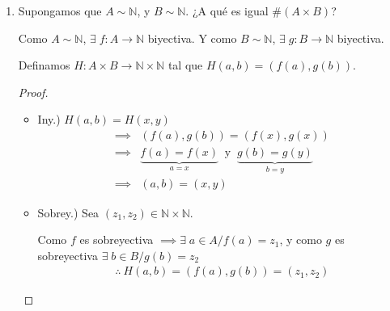 \begin{enumerate}
\begin{proof}\phantom{.}
    \begin{itemize}
        \item Iny.) $F(n) = F(k) \implies 2n+1 = 2k+1 \implies n = k$
        \item Sobrey.) Sea $b \in X$, siendo $b$ impar y $b \geq 1$ y $b-1$ par
            para $b\geq 0$.

            Así, $\frac{b-1}{2} \in \mathbb{N}$, con lo cual 
            $F\left(\frac{b-1}{2}\right) = 2\; . \; \left(\frac{b-1}{2}\right)
            + 1 = b$
        \item Biy.) Como es inyectiva y sobreyectiva, entonces es biyectiva.
    \end{itemize}
    \begin{gather*}
        \therefore ~ \#X=\#\mathbb{N} = \aleph_0
    \end{gather*}

\end{proof}


\item Supongamos que $A \sim \mathbb{N}$, y $B \sim \mathbb{N}$.
        ¿A qué es igual $\# (A\times B)$?

Como $A \sim \mathbb{N}$, $\exists \; f: A\to\mathbb{N}$ biyectiva.
Y como $B\sim\mathbb{N}$, $\exists \; g: B\to\mathbb{N}$ biyectiva.

Definamos $H: A \times B \to \mathbb{N}\times\mathbb{N}$ tal que 
$H(a,b) = \left(f(a), g(b)\right)$.

\begin{proof}\phantom{.}

    \begin{itemize}
        \item Iny.) $H(a,b) = H(x,y)$ 
            \begin{align*}
                \implies& \left(f(a),g(b)\right) = \left(f(x),g(x)\right) \\
                \implies& \underbrace{f(a) = f(x)}_{a=x} ~ \text{ y } ~ 
                \underbrace{g(b) = g(y)}_{b=y} \\
                \implies& (a,b)=(x,y)
            \end{align*}

        \item Sobrey.) Sea $(z_1, z_2) \in \mathbb{N}\times\mathbb{N}$.

        Como $f$ es sobreyectiva $\implies \exists \; a \in A/ f(a) = z_1$,
        y como $g$ es sobreyectiva $\exists \; b \in B/g(b)=z_2$
        \begin{gather*}
            \therefore ~ H(a,b) = \left(f(a),g(b)\right)=(z_1,z_2)
        \end{gather*}


\end{itemize}
\end{proof}
\end{enumerate}
